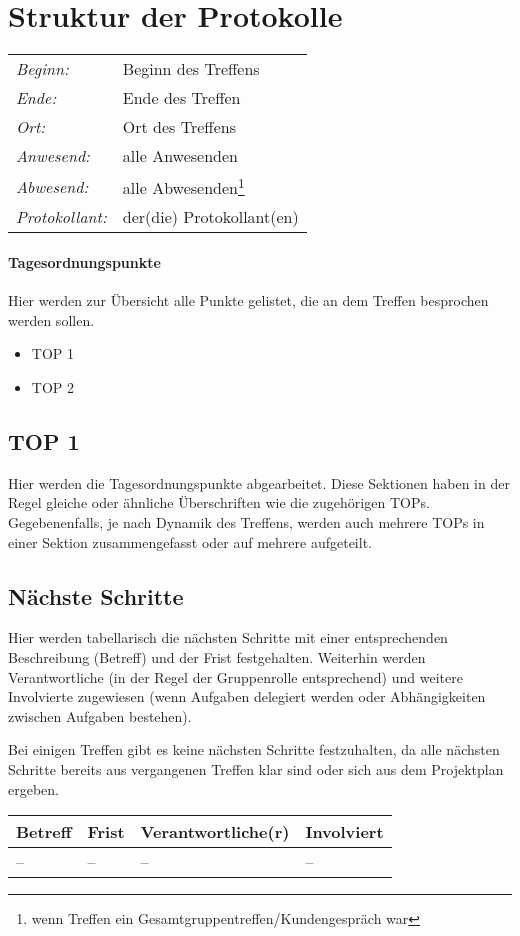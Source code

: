 \section*{Struktur der Protokolle}
\begin{tabular}[t]{p{.25\linewidth} p{.35\linewidth}}
\emph{Beginn:}				& Beginn des Treffens\\
\emph{Ende:}					& Ende des Treffen\\
\emph{Ort:}						& Ort des Treffens\\
\emph{Anwesend:}	& alle Anwesenden\\
\emph{Abwesend:}		 & alle Abwesenden\footnote{wenn Treffen ein Gesamtgruppentreffen/Kundengespräch war}\\
\emph{Protokollant:}& der(die) Protokollant(en)
\end{tabular}
\paragraph*{Tagesordnungspunkte}
Hier werden zur Übersicht alle Punkte gelistet, die an dem Treffen besprochen werden sollen.
\begin{itemize}
\item TOP 1
\item TOP 2
\end{itemize}

\subsection*{TOP 1}
Hier werden die Tagesordnungspunkte abgearbeitet. Diese Sektionen haben in der Regel gleiche oder ähnliche Überschriften wie die zugehörigen TOPs. Gegebenenfalls, je nach Dynamik des Treffens, werden auch mehrere TOPs in einer Sektion zusammengefasst oder auf mehrere aufgeteilt.

\subsection*{Nächste Schritte}
Hier werden tabellarisch die nächsten Schritte mit einer entsprechenden Beschreibung (Betreff) und der Frist festgehalten. Weiterhin werden Verantwortliche (in der Regel der Gruppenrolle entsprechend) und weitere Involvierte zugewiesen (wenn Aufgaben delegiert werden oder Abhängigkeiten zwischen Aufgaben bestehen).

Bei einigen Treffen gibt es keine nächsten Schritte festzuhalten, da alle nächsten Schritte bereits aus vergangenen Treffen klar sind oder sich aus dem Projektplan ergeben.\\
\begin{tabular}{L{.249} L{.2} L{.25} L{.25}}
Betreff & Frist & Verantwortliche(r) & Involviert\\\hline
-- & -- & -- & --\\
\end{tabular}